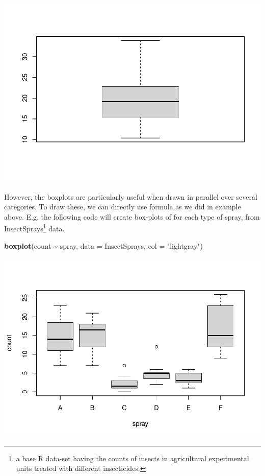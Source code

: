 \documentclass[
]{book}
\newenvironment{Shaded}{\begin{snugshade}}{\end{snugshade}}
\newcommand{\AttributeTok}[1]{\textcolor[rgb]{0.13,0.29,0.53}{#1}}
\newcommand{\FunctionTok}[1]{\textcolor[rgb]{0.13,0.29,0.53}{\textbf{#1}}}
\newcommand{\NormalTok}[1]{#1}
\newcommand{\SpecialCharTok}[1]{\textcolor[rgb]{0.81,0.36,0.00}{\textbf{#1}}}
\newcommand{\StringTok}[1]{\textcolor[rgb]{0.31,0.60,0.02}{#1}}
\begin{document}
\begin{center}\includegraphics[height=0.55\textheight]{DauR_files/figure-latex/p13-1} \end{center}

However, the boxplots are particularly useful when drawn in parallel over several categories. To draw these, we can directly use formula as we did in example above. E.g. the following code will create box-plots of for each type of spray, from InsectSprays\footnote{a base R data-set having the counts of insects in agricultural experimental units treated with different insecticides.} data.

\begin{Shaded}
\begin{Highlighting}[]
\FunctionTok{boxplot}\NormalTok{(count }\SpecialCharTok{\textasciitilde{}}\NormalTok{ spray, }
        \AttributeTok{data =}\NormalTok{ InsectSprays, }
        \AttributeTok{col =} \StringTok{"lightgray"}\NormalTok{)}
\end{Highlighting}
\end{Shaded}

\begin{center}\includegraphics[height=0.55\textheight]{DauR_files/figure-latex/p14-1} \end{center}
\end{document}
